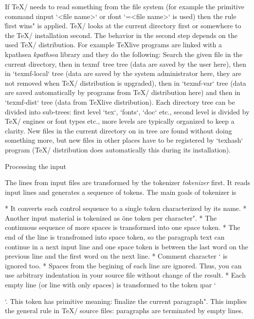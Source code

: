 If \TeX/ needs to read something from the file system (for example the
primitive command \i input `<file name>` or 
\i font `=<file name>` is used) 
then the rule
\"first wins" is applied. \TeX/ looks at the current directory first or
somewhere to the \TeX/ installation second. The behavior in the second step
depends on the used \TeX/ distribution. For example 
\ii TeXlive  programs are
linked with a \ii kpathsea {\em kpathsea} library and they do the following: Search the given
file in the current directory, then in \ii texmf~tree  tree (data are saved by
the user here), then in `texmf-local` tree (data are saved by the system administrator
here, they are not removed when \TeX/ distribution is upgraded), 
then in `texmf-var` tree (data are saved automatically by programs from
\TeX/ distribution here) and then in `texmf-dist` tree (data from \TeX live
distribution). Each directory tree can be divided into sub-trees: first level
`tex`, `fonts`, `doc` etc., second level is divided by \TeX/ engines or font types etc.,
more levels are typically organized to keep a clarity.
New files in the current directory on in  tree are found without 
doing something more, but new files in other places have to be registered by `texhash`
program (\TeX/ distribution does automatically this during its installation).


\sec Processing the input

The lines from input files are transformed by the \ii tokenizer {\em tokenizer} first.
It reads input lines and generates a sequence of tokens. The main goals of
tokenizer is

\begitems
* It converts each control sequence to a single token characterized by its name.
* Another input material is tokenized as \"one token per character".
* The continuous sequence of more spaces is transformed into one space token.
* The end of the line is transfromed into space token, so the paragraph text
  can continue in a next input line and one space token is between the last word
  on the previous line and the first word on the next line.
* Comment character `%
  is ignored too.
* Spaces from the begining of each line are ignored. Thus, you can
  use arbitrary indentation in your source file without change of the result.
* Each empty line (or line with only spaces) is transformed to the token
  \i par `\par`. This token has primitive meaning: \"finalize the current paragraph".
  This implies the general rule in \TeX/ source files: paragraphs are terminated 
  by empty lines. 
\enditems


